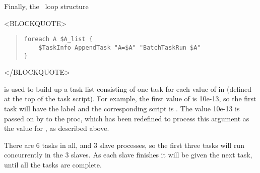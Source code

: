 Finally, the \Tcl\ loop structure
\begin{rawhtml}
<BLOCKQUOTE>
\end{rawhtml}
\begin{quote}
\begin{verbatim}
foreach A $A_list {
    $TaskInfo AppendTask "A=$A" "BatchTaskRun $A"
}
\end{verbatim}
\end{quote}
\begin{rawhtml}
</BLOCKQUOTE>
\end{rawhtml}
is used to build up a task list consisting of one task for each value
of  in  (defined at the top of the task script).  For
example, the first value of  is 10e-13, so the first task
will have the label  and the corresponding script is
.  The value 10e-13 is passed on by
 to the  proc, which has been
redefined to process this argument as the value for , as
described above.

There are 6 tasks in all, and 3 slave processes, so the first three
tasks will run concurrently in the 3 slaves.  As each slave finishes
it will be given the next task, until all the tasks are complete.

